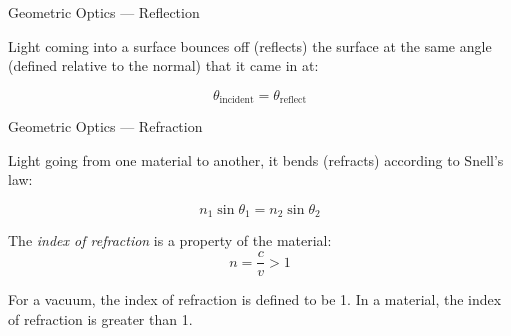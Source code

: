 \documentclass{beamer}
\begin{document}
\begin{frame}{Geometric Optics --- Reflection}

Light coming into a surface bounces off (reflects) the surface at the same angle (defined relative to the normal) that it came in at:

\begin{equation*}
    \theta_{\text{incident}} = \theta_{\text{reflect}}
\end{equation*}

\begin{figure}[H]
\centering
{}
\end{figure}

\end{frame}

\begin{frame}{Geometric Optics --- Refraction}

Light going from one material to another, it bends (refracts) according to Snell's law:

\begin{equation*}
    n_1 \sin{\theta_1} = n_2 \sin{\theta_2}
\end{equation*}

\begin{figure}[H]
\centering
{}
\end{figure}

The \emph{index of refraction} is a property of the material:
\begin{equation*}
    n = \frac{c}{v} > 1
\end{equation*}

For a vacuum, the index of refraction is defined to be 1. In a material, the index of refraction is greater than 1.

\end{frame}
\end{document}
